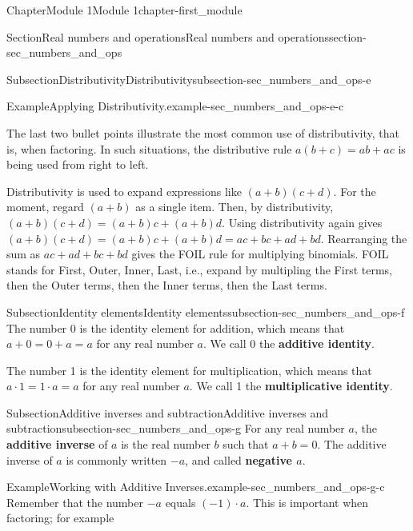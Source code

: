 \documentclass[oneside,10pt,]{book}
\newcommand{\terminology}[1]{\textbf{#1}}
\begin{document}
\begin{chapterptx}{Chapter}{Module 1}{}{Module 1}{}{}{chapter-first_module}
\begin{sectionptx}{Section}{Real numbers and operations}{}{Real numbers and operations}{}{}{section-sec_numbers_and_ops}
\begin{subsectionptx}{Subsection}{Distributivity}{}{Distributivity}{}{}{subsection-sec_numbers_and_ops-e}
\begin{example}{Example}{Applying Distributivity.}{example-sec_numbers_and_ops-e-c}
\begin{itemize}[label=\textbullet]
\end{itemize}
%
\end{example}
The last two bullet points illustrate the most common use of distributivity, that is, when factoring.  In such situations, the distributive rule \(a (b + c) = ab + a c\) is being used from right to left.%
\par
Distributivity is used to expand expressions like \((a + b)(c + d)\).  For the moment, regard \((a + b)\) as a single item.  Then, by distributivity, \((a + b)(c + d) = (a + b)c + (a+b)d\).  Using distributivity again gives \((a + b)(c + d) = (a + b)c + (a+b)d = ac + bc + ad + bd\).  Rearranging the sum as \(ac + ad + bc + bd\) gives the FOIL rule for multiplying binomials.  FOIL stands for First, Outer, Inner, Last, i.e., expand by multipling the First terms, then the Outer terms, then the Inner terms, then the Last terms.%
\end{subsectionptx}
%
%
\typeout{************************************************}
\typeout{************************************************}
%
\begin{subsectionptx}{Subsection}{Identity elements}{}{Identity elements}{}{}{subsection-sec_numbers_and_ops-f}
%
The number 0 is the identity element for addition, which means that \(a + 0 = 0 + a = a\) for any real number \(a\).  We call 0 the \terminology{additive identity}.%
\par
{}The number 1 is the identity element for multiplication, which means that \(a \cdot 1 = 1 \cdot a = a\) for any real number \(a\).  We call 1 the \terminology{multiplicative identity}.%
\end{subsectionptx}
%
%
\typeout{************************************************}
\typeout{************************************************}
%
\begin{subsectionptx}{Subsection}{Additive inverses and subtraction}{}{Additive inverses and subtraction}{}{}{subsection-sec_numbers_and_ops-g}
For any real number \(a\), the \terminology{additive inverse} of \(a\) is the real number \(b\) such that \(a + b = 0\).  The additive inverse of \(a\) is commonly written \(-a\), and called \terminology{negative \(a\)}.%
\begin{example}{Example}{Working with Additive Inverses.}{example-sec_numbers_and_ops-g-c}%
Remember that the number \(-a\) equals \((-1)\cdot a\).  This is important when factoring; for example%

\end{example}
\end{subsectionptx}
\end{sectionptx}
\end{chapterptx}
\end{document}
